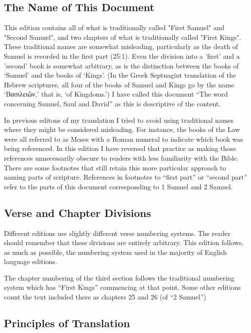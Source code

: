 {\subsection*{The Name of This Document}

This edition contains all of what is traditionally called "First Samuel"
and "Second Samuel", and two chapters of what is traditionally called
"First Kings". These traditional names are somewhat misleading, particularly as the death of
Samuel is recorded in the first part (25:1). Even the division into a
'first' and a 'second' book is somewhat arbitrary, as is the
distinction between the books of `Samuel' and the books of
`Kings'. (In the Greek Septuagint translation of the Hebrew
scriptures, all four of the books of Samuel and Kings go by the name
`\textgreek{Βασιλειῶν},' that is, `of Kingdoms.')
I have called this document 
``The word concerning Samuel, Saul and David'' as this is descriptive of the
content. 

In previous editons of my translation I tried to avoid using traditional names where they might be considered misleading. For instance, the books of the Law were all referred to as Moses with a Roman numeral to indicate which book was being referenced.  In this edition I have reversed that practice as making those references unnecessarily obscure to readers with less familiarity with the Bible. There are some footnotes that still retain this more particular approach to naming parts of scripture. References in footnotes to ``first part'' or ``second part'' refer to the parts of this document corresponding to 1 Samuel and 2 Samuel.

\subsection*{Verse and Chapter Divisions}

Different editions use slightly different verse numbering systems. The
reader should remember that these divisions are entirely arbitrary. This
edition follows, as much as possible, the numbering system used in the
majority of English language editions. 

The chapter numbering of the third section follows the traditional
numbering system which has ``First Kings'' commencing at that
point. Some other editions count the text included there as chapters
25 and 26 (of ``2 Samuel'') 


\subsection*{Principles of Translation}

}

